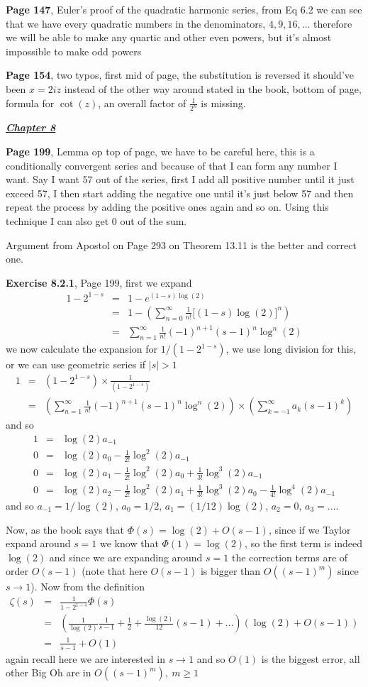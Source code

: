 \documentclass[aps,preprint,preprintnumbers,nofootinbib,showpacs,prd]{revtex4-1}
\newcommand{\nbea}{\begin{eqnarray*}}
\newcommand{\neea}{\end{eqnarray*}}
\begin{document}
{\bf Page 147}, Euler's proof of the quadratic harmonic series, from Eq 6.2 we can see that we have every quadratic numbers in the denominators, $4,9,16,\ldots$ therefore we will be able to make any quartic and other even powers, but it's almost impossible to make odd powers

{\bf Page 154}, two typos, first mid of page, the substitution is reversed it should've been $x = 2iz$ instead of the other way around stated in the book, bottom of page, formula for $\cot(z)$, an overall factor of $\frac{1}{2^n}$ is missing.

\bigskip
\underline{\textit{\textbf{Chapter 8}}}
\bigskip

{\bf Page 199}, Lemma op top of page, we have to be careful here, this is a conditionally convergent series and because of that I can form any number I want. Say I want 57 out of the series, first I add all positive number until it just exceed 57, I then start adding the negative one until it's just below 57 and then repeat the process by adding the positive ones again and so on. Using this technique I can also get 0 out of the sum.

Argument from Apostol on Page 293 on Theorem 13.11 is the better and correct one.

{\bf Exercise 8.2.1}, Page 199, first we expand
%
\nbea
1 - 2^{1-s} & = & 1 - e^{(1-s)\log(2)} \\
& = & 1 - \left ( \sum_{n=0}^\infty \frac{1}{n!} \lbrack(1-s)\log(2)\rbrack^n \right ) \\
& = & \sum_{n=1}^\infty \frac{1}{n!} (-1)^{n+1} (s-1)^n \log^n(2)
\neea
%
we now calculate the expansion for $1/(1 - 2^{1-s})$, we use long division for this, or we can use geometric series if $|s| > 1$
%
\nbea
1 & = & (1 - 2^{1-s})\times\frac{1}{(1 - 2^{1-s})} \\
& = & \left(\sum_{n=1}^\infty \frac{1}{n!} (-1)^{n+1} (s-1)^n \log^n(2)\right)\times\left(\sum_{k=-1}^\infty a_k(s-1)^k\right)
\neea
%
and so
%
\nbea
1 & = & \log(2) a_{-1} \\
0 & = & \log(2) a_0 - \frac{1}{2!}\log^2(2) a_{-1} \\
0 & = & \log(2) a_1 - \frac{1}{2!}\log^2(2) a_{0} + \frac{1}{3!}\log^3(2) a_{-1} \\
0 & = & \log(2) a_2 - \frac{1}{2!}\log^2(2) a_{1} + \frac{1}{3!}\log^3(2) a_{0} - \frac{1}{4!}\log^4(2) a_{-1}
\neea
%
and so $a_{-1} = 1/\log(2)$, $a_0 = 1/2$, $a_1 = (1/12)\log(2)$, $a_2 = 0$, $a_3 = \ldots$.

Now, as the book says that $\Phi(s) = \log(2) + O(s-1)$, since if we Taylor expand around $s=1$ we know that $\Phi(1) = \log(2)$, so the first term is indeed $\log(2)$ and since we are expanding around $s=1$ the correction terms are of order $O(s-1)$ (note that here $O(s-1)$ is bigger than $O((s-1)^m)$ since $s\to1$). Now from the definition
%
\nbea
\zeta(s) & = & \frac{1}{1-2^{1-s}} \Phi(s) \\
& = & \left( \frac{1}{\log(2)}\frac{1}{s-1} + \frac{1}{2} + \frac{\log(2)}{12}(s-1) + \ldots \right)\left( \log(2) + O(s-1)\right) \\
& = & \frac{1}{s-1} + O(1)
\neea
%
again recall here we are interested in $s\to1$ and so $O(1)$ is the biggest error, all other Big Oh are in $O((s-1)^m),~m \ge 1$
\end{document}
